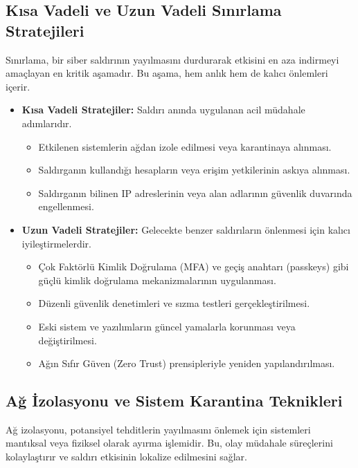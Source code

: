 \subsection{Kısa Vadeli ve Uzun Vadeli Sınırlama Stratejileri}

Sınırlama, bir siber saldırının yayılmasını durdurarak etkisini en aza indirmeyi amaçlayan en kritik aşamadır. Bu aşama, hem anlık hem de kalıcı önlemleri içerir.

\begin{itemize}
    \item \textbf{Kısa Vadeli Stratejiler:} Saldırı anında uygulanan acil müdahale adımlarıdır.
    \begin{itemize}
        \item Etkilenen sistemlerin ağdan izole edilmesi veya karantinaya alınması.
        \item Saldırganın kullandığı hesapların veya erişim yetkilerinin askıya alınması.
        \item Saldırganın bilinen IP adreslerinin veya alan adlarının güvenlik duvarında engellenmesi.
    \end{itemize}
    \item \textbf{Uzun Vadeli Stratejiler:} Gelecekte benzer saldırıların önlenmesi için kalıcı iyileştirmelerdir.
    \begin{itemize}
        \item Çok Faktörlü Kimlik Doğrulama (MFA) ve geçiş anahtarı (passkeys) gibi güçlü kimlik doğrulama mekanizmalarının uygulanması.
        \item Düzenli güvenlik denetimleri ve sızma testleri gerçekleştirilmesi.
        \item Eski sistem ve yazılımların güncel yamalarla korunması veya değiştirilmesi.
        \item Ağın Sıfır Güven (Zero Trust) prensipleriyle yeniden yapılandırılması.
    \end{itemize}
\end{itemize}

\subsection{Ağ İzolasyonu ve Sistem Karantina Teknikleri}

Ağ izolasyonu, potansiyel tehditlerin yayılmasını önlemek için sistemleri mantıksal veya fiziksel olarak ayırma işlemidir. Bu, olay müdahale süreçlerini kolaylaştırır ve saldırı etkisinin lokalize edilmesini sağlar.

